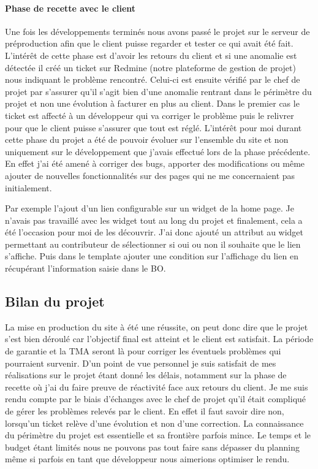 \documentclass[a4paper,11pt,twoside]{report}
\begin{document}
	\paragraph*{Phase de recette avec le client}
	Une fois les développements terminés nous avons passé le projet sur le serveur de préproduction afin que le client puisse regarder et tester ce qui avait été fait. L'intérêt de cette phase est d'avoir les retours du client et si une anomalie est détectée il créé un ticket sur Redmine (notre plateforme de gestion de projet) nous indiquant le problème rencontré. Celui-ci est ensuite vérifié par le chef de projet par s'assurer qu'il s'agit bien d'une anomalie rentrant dans le périmètre du projet et non une évolution à facturer en plus au client. Dans le premier cas le ticket est affecté à un développeur qui va corriger le problème puis le relivrer pour que le client puisse s'assurer que tout est réglé. 
	L'intérêt pour moi durant cette phase du projet a été de pouvoir évoluer sur l'ensemble du site et non uniquement sur le développement que j'avais effectué lors de la phase précédente. En effet j'ai été amené à corriger des bugs, apporter des modifications ou même ajouter de nouvelles fonctionnalités sur des pages qui ne me concernaient pas initialement. 
	
	Par exemple l'ajout d'un lien configurable sur un widget de la home page. Je n'avais pas travaillé avec les widget tout au long du projet et finalement, cela a été l'occasion pour moi de les découvrir. J'ai donc ajouté un attribut au widget permettant au contributeur de sélectionner si oui ou non il souhaite que le lien s'affiche. Puis dans le template ajouter une condition sur l'affichage du lien en récupérant l'information saisie dans le BO.  
    \subsection*{Bilan du projet}
    La mise en production du site à été une réussite, on peut donc dire que le projet s'est bien déroulé car l'objectif final est atteint et le client est satisfait. La période de garantie et la TMA seront là pour corriger les éventuels problèmes qui pourraient survenir. D'un point de vue personnel je suis satisfait de mes réalisations sur le projet étant donné les délais, notamment sur la phase de recette où j'ai du faire preuve de réactivité face aux retours du client. Je me suis rendu compte par le biais d'échanges avec le chef de projet qu'il était compliqué de gérer les problèmes relevés par le client. En effet il faut savoir dire non, lorsqu'un ticket relève d'une évolution et non d'une correction. La connaissance du périmètre du projet est essentielle et sa frontière parfois mince. Le temps et le budget étant limités nous ne pouvons pas tout faire sans dépasser du planning même si parfois en tant que développeur nous aimerions optimiser le rendu.
    
\end{document}
